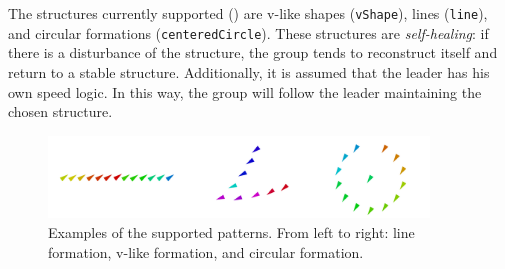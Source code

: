 The structures currently supported () are v-like shapes (\lstinline|vShape|), lines (\lstinline|line|), and circular formations (\lstinline|centeredCircle|). 
 These structures are \emph{self-healing}: if there is a disturbance 
 of the structure, 
 the group tends to reconstruct itself and return to a stable structure. 
Additionally, it is assumed that the leader has his own speed logic. 
 In this way,
 the group will follow the leader maintaining the chosen structure. 
\begin{figure}[t]
  \centering
  \includegraphics[width=0.9\textwidth]{papers/coordination2023-macro/images/shapes.png}
  \caption{Examples of the supported patterns. From left to right: 
   line formation, v-like formation, and
   circular formation.
  }
   \label{coordination2023-macro:fig:formations}
\end{figure}
  
